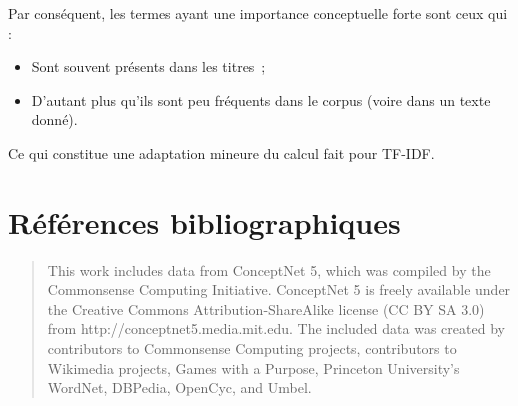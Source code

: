 \documentclass[a4paper, 12pt]{article}
\begin{document}
Par conséquent, les termes ayant une importance conceptuelle forte sont ceux qui :
\begin{itemize}
	\item Sont souvent présents dans les titres~;
	\item D'autant plus qu'ils sont peu fréquents dans le corpus (voire dans un texte donné).
\end{itemize}
Ce qui constitue une adaptation mineure du calcul fait pour TF-IDF.






 

\section{Références bibliographiques}

\begin{quotation}
 This work includes data from ConceptNet 5, which was compiled by the Commonsense Computing Initiative. ConceptNet 5 is freely available under the Creative Commons Attribution-ShareAlike license (CC BY SA 3.0) from http://conceptnet5.media.mit.edu. The included data was created by contributors to Commonsense Computing projects, contributors to Wikimedia projects, Games with a Purpose, Princeton University's WordNet, DBPedia, OpenCyc, and Umbel.
\end{quotation}

\nocite{*}
\printbibliography{}

\appendix

\printindex
\end{document}
